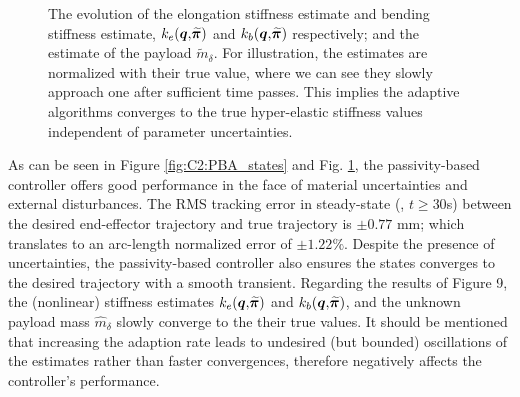 {\begin{figure}[!t]
  \vspace{-3mm}
  \caption{The evolution of the elongation stiffness estimate and bending stiffness estimate, ${k}_e({\boldsymbol{q}},\widetilde{\!\boldsymbol{\pi}})$ and ${k}_b({\boldsymbol{q}},\widetilde{\!\boldsymbol{\pi}})$ respectively; and the estimate of the payload $\tilde{m}_\delta$. For illustration, the estimates are normalized with their true value, where we can see they slowly approach one after sufficient time passes. This implies the adaptive algorithms converges to the true hyper-elastic stiffness values independent of parameter uncertainties. \label{fig:C2:PBA_parameters}}
  \end{figure}
  \clearpage
}

%


As can be seen in Figure \ref{fig:C2:PBA_states} and Fig. \ref{fig:C2:PBA_parameters}, the passivity-based controller offers good performance in the face of material uncertainties and external disturbances. The RMS tracking error in steady-state (\ie, $t \ge 30$s) between the desired end-effector trajectory and true trajectory is $\pm0.77$ mm; which translates to an arc-length normalized error of $\pm1.22\%$. Despite the presence of uncertainties, the passivity-based controller also ensures the states converges to the desired trajectory with a smooth transient. Regarding the results of Figure 9, the (nonlinear) stiffness estimates ${k}_e({\boldsymbol{q}},\widetilde{\!\boldsymbol{\pi}})$ and $k_b({\boldsymbol{q}},\widetilde{\!\boldsymbol{\pi}})$, and the unknown payload mass $\hat{m}_\delta$ slowly converge to the their true values. It should be mentioned that increasing the adaption rate leads to undesired (but bounded) oscillations of the estimates rather than faster convergences, therefore negatively affects the controller's performance.
